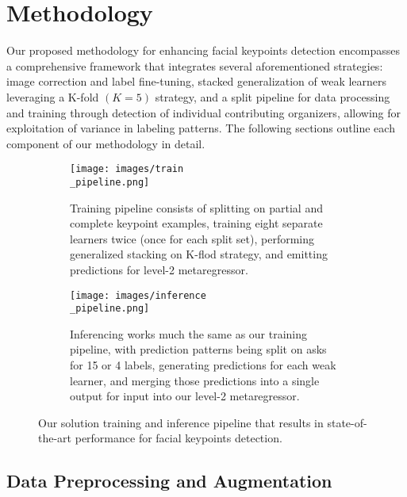 \section{Methodology}
\label{sec:methodology}

Our proposed methodology for enhancing facial keypoints detection encompasses a comprehensive framework that integrates several aforementioned strategies: image correction and label fine-tuning, stacked generalization of weak learners leveraging a K-fold $(K=5)$ strategy, and a split pipeline for data processing and training through detection of individual contributing organizers, allowing for exploitation of variance in labeling patterns. The following sections outline each component of our methodology in detail.

\begin{figure*}
	\centering
	\begin{subfigure}{0.49\linewidth}
		\texttt{[image: images/train\\\_pipeline.png]}
		\caption{Training pipeline consists of splitting on partial and complete keypoint examples, training eight separate learners twice (once for each split set), performing generalized stacking on K-flod strategy, and emitting predictions for level-2 metaregressor.}
		\label{fig:short-a}
	\end{subfigure}
	\hfill
	\begin{subfigure}{0.49\linewidth}
		\texttt{[image: images/inference\\\_pipeline.png]}
		\caption{Inferencing works much the same as our training pipeline, with prediction patterns being split on asks for 15 or 4 labels, generating predictions for each weak learner, and merging those predictions into a single output for input into our level-2 metaregressor.}
		\label{fig:short-b}
	\end{subfigure}
	\caption{Our solution training and inference pipeline that results in state-of-the-art performance for facial keypoints detection.}
	\label{fig:fig2}
\end{figure*}

\subsection{Data Preprocessing and Augmentation}

